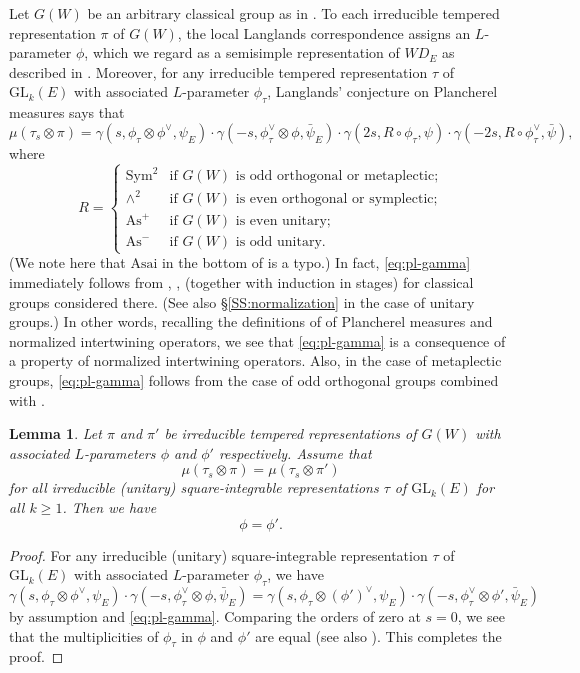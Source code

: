 \documentclass[11pt]{amsart}
\numberwithin{equation}{section}
\theoremstyle{plain}
\newtheorem{lem}[thm]{Lemma}
\theoremstyle{definition}
\theoremstyle{remark}
\def\As{\mathrm{As}}
\def\GL{\mathrm{GL}}
\def\WD{\mathit{WD}}
\begin{document}
Let $G(W)$ be an arbitrary classical group as in \cite[\S 2]{gi}.
To each irreducible tempered representation $\pi$ of $G(W)$, the local Langlands correspondence assigns an $L$-parameter $\phi$, which we regard as a semisimple representation of $\WD_E$ as described in \cite[\S 8]{ggp1}.
Moreover, for any irreducible tempered representation $\tau$ of $\GL_k(E)$ with associated $L$-parameter $\phi_\tau$, Langlands' conjecture on Plancherel measures \cite[Appendix II]{l} says that
\begin{equation}
\label{eq:pl-gamma}
 \mu(\tau_s \otimes \pi) = \gamma(s, \phi_\tau \otimes \phi^\vee, \psi_E) \cdot \gamma(-s, \phi_\tau^\vee \otimes \phi, \bar{\psi}_E) \cdot \gamma(2s, R \circ \phi_\tau, \psi) \cdot \gamma(-2s, R \circ \phi_\tau^\vee, \bar{\psi}),
\end{equation}
where
\[
 R = 
 \begin{cases}
  \mathrm{Sym}^2 & \text{if $G(W)$ is odd orthogonal or metaplectic;} \\
  \wedge^2 & \text{if $G(W)$ is even orthogonal or symplectic;} \\
  \As^+ & \text{if $G(W)$ is even unitary;} \\
  \As^- & \text{if $G(W)$ is odd unitary.}
 \end{cases}
\]
(We note here that $\mathrm{Asai}$ in the bottom of \cite[p.~650]{gi} is a typo.)
In fact, \eqref{eq:pl-gamma} immediately follows from \cite[Proposition 2.3.1]{a}, \cite[Proposition 3.3.1]{mok}, \cite[Lemmas 2.2.3]{kmsw} (together with induction in stages) for classical groups considered there.
(See also \S \ref{SS:normalization} in the case of unitary groups.)
In other words, recalling the definitions of of Plancherel measures and normalized intertwining operators, we see that \eqref{eq:pl-gamma} is a consequence of a property of normalized intertwining operators.
Also, in the case of metaplectic groups, \eqref{eq:pl-gamma} follows from the case of odd orthogonal groups combined with \cite[Proposition 10.1]{gs}.

\begin{lem}
Let $\pi$ and $\pi'$ be irreducible tempered representations of $G(W)$ with associated $L$-parameters $\phi$ and $\phi'$ respectively.
Assume that
\[
 \mu(\tau_s \otimes \pi) = \mu(\tau_s \otimes \pi') 
\]
for all irreducible (unitary) square-integrable representations $\tau$ of $\GL_k(E)$ for all $k \ge 1$.
Then we have
\[
 \phi = \phi'.
\]
\end{lem}

\begin{proof}
For any irreducible (unitary) square-integrable representation $\tau$ of $\GL_k(E)$ with associated $L$-parameter $\phi_\tau$, we have
\[
 \gamma(s, \phi_\tau \otimes \phi^\vee, \psi_E) \cdot \gamma(-s, \phi_\tau^\vee \otimes \phi, \bar{\psi}_E) 
 = \gamma(s, \phi_\tau \otimes (\phi')^\vee, \psi_E) \cdot \gamma(-s, \phi_\tau^\vee \otimes \phi', \bar{\psi}_E)
\]
by assumption and \eqref{eq:pl-gamma}.
Comparing the orders of zero at $s=0$, we see that the multiplicities of $\phi_\tau$ in $\phi$ and $\phi'$ are equal (see also \cite[Lemma 12.3]{gs}).
This completes the proof.
\end{proof}
\end{document}
